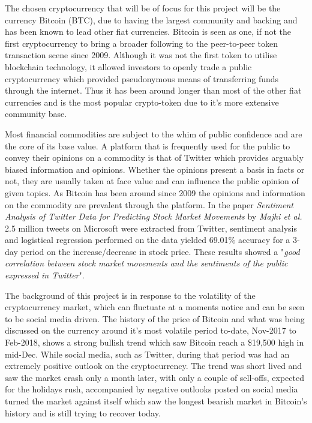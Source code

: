 \documentclass[oneside, 12pt]{article}
\begin{document}
	The chosen cryptocurrency that will be of focus for this project will be the currency Bitcoin (BTC), due to having the largest community and backing and has been known to lead other fiat currencies. Bitcoin is seen as one, if not the first cryptocurrency to bring a broader following to the peer-to-peer token transaction scene since 2009. Although it was not the first token to utilise blockchain technology, it allowed investors to openly trade a public cryptocurrency which provided pseudonymous means of transferring funds through the internet. Thus it has been around longer than most of the other fiat currencies and is the most popular crypto-token due to it's more extensive community base.
	
	Most financial commodities are subject to the whim of public confidence and are the core of its base value. A platform that is frequently used for the public to convey their opinions on a commodity is that of Twitter which provides arguably biased information and opinions. Whether the opinions present a basis in facts or not, they are usually taken at face value and can influence the public opinion of given topics. As Bitcoin has been around since 2009 the opinions and information on the commodity are prevalent through the platform. 
	In the paper \textit{Sentiment Analysis of Twitter Data for Predicting Stock Market Movements} by \textit{Majhi et al.} \cite{1} 2.5 million tweets on Microsoft were extracted from Twitter, sentiment analysis and logistical regression performed on the data yielded 69.01\% accuracy for a 3-day period on the increase/decrease in stock price. These results showed a "\textit{good correlation between stock market movements and the sentiments of the public expressed in Twitter}".
	
	The background of this project is in response to the volatility of the cryptocurrency market, which can fluctuate at a moments notice and can be seen to be social media driven. The history of the price of Bitcoin and what was being discussed on the currency around it's most volatile period to-date, Nov-2017 to Feb-2018, shows a strong bullish trend which saw Bitcoin reach a \$19,500 high in mid-Dec. While social media, such as Twitter, during that period was had an extremely positive outlook on the cryptocurrency. The trend was short lived and saw the market crash only a month later, with only a couple of sell-offs, expected for the holidays rush, accompanied by negative outlooks posted on social media turned the market against itself which saw the longest bearish market in Bitcoin's history and is still trying to recover today.
	
\end{document}
